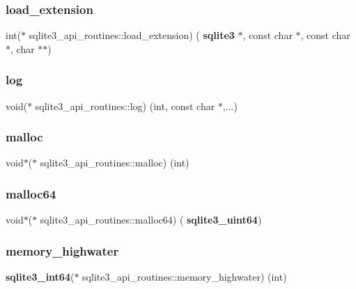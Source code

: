 \subsubsection{load\_extension}
{\footnotesize\ttfamily int($\ast$ sqlite3\+\_\+api\+\_\+routines\+::load\+\_\+extension) (\textbf{ sqlite3} $\ast$, const char $\ast$, const char $\ast$, char $\ast$$\ast$)}

\mbox{\label{structsqlite3__api__routines_a0111f46a6683e3388f3ba8dd494fa04c}} 
\subsubsection{log}
{\footnotesize\ttfamily void($\ast$ sqlite3\+\_\+api\+\_\+routines\+::log) (int, const char $\ast$,...)}

\mbox{\label{structsqlite3__api__routines_a1c4b2c2102460266ffb4e7609708684a}} 
\subsubsection{malloc}
{\footnotesize\ttfamily void$\ast$($\ast$ sqlite3\+\_\+api\+\_\+routines\+::malloc) (int)}

\mbox{\label{structsqlite3__api__routines_a2c977ab4d411d120321302b42e3c3139}} 
\subsubsection{malloc64}
{\footnotesize\ttfamily void$\ast$($\ast$ sqlite3\+\_\+api\+\_\+routines\+::malloc64) (\textbf{ sqlite3\+\_\+uint64})}

\mbox{\label{structsqlite3__api__routines_a92684afad13af8e23f02fd66ec04feba}} 
\subsubsection{memory\_highwater}
{\footnotesize\ttfamily \textbf{ sqlite3\+\_\+int64}($\ast$ sqlite3\+\_\+api\+\_\+routines\+::memory\+\_\+highwater) (int)}

